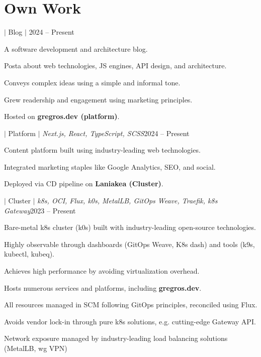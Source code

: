 \documentclass[a4paper,11pt]{article}
\begin{document}
\section{Own Work}
\begin{sectionList}
    \begin{project}{\textbf{\gregrosdev} $|$ Blog $|$ \https{\mywebsite}}{2024 -- Present}
        \item A software development and architecture blog.
        \item Posta about web technologies, JS engines, API design, and architecture.
        \item Conveys complex ideas using a simple and informal tone.
        \item Grew readership and engagement using marketing principles.
        \item Hosted on \textbf{gregros.dev (platform)}.
    \end{project}
    \begin{project}{\textbf{\gregrosdev} $|$ Platform $|$ \textit{Next.js, React, TypeScript, SCSS}}{2024 -- Present}
        \item Content platform built using industry-leading web technologies.
        \item Integrated marketing staples like Google Analytics, SEO, and social.
        \item Deployed via CD pipeline on \textbf{Laniakea (Cluster)}.
    \end{project}
    \begin{project}{\textbf{\laniakea} $|$ Cluster $|$ \textit{k8s, OCI, Flux, k0s, MetalLB, GitOps Weave, Traefik, k8s Gateway}}{2023 -- Present}
        \item Bare-metal k8s cluster (k0s) built with industry-leading open-source technologies.
        \item Highly observable through dashboards (GitOps Weave, K8s dash) and tools (k9s, kubectl, kubeq).
        \item Achieves high performance by avoiding virtualization overhead.
        \item Hosts numerous services and platforms, including \textbf{gregros.dev}.
        \item All resources managed in SCM following GitOps principles, reconciled using Flux.
        \item Avoids vendor lock-in through pure k8s solutions, e.g. cutting-edge Gateway API.
        \item Network exposure managed by industry-leading load balancing solutions (MetalLB, wg VPN)

\end{project}
\end{sectionList}
\end{document}

